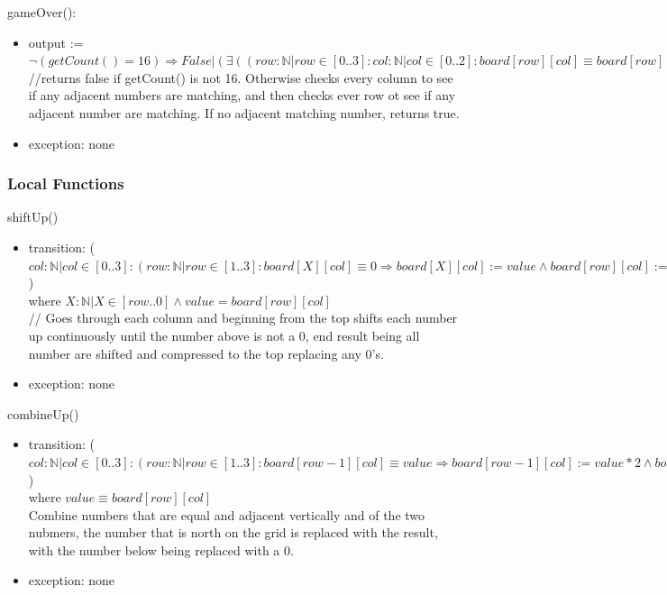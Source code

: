 \documentclass[12pt]{article}
\begin{document}
\noindent gameOver():
\begin{itemize}
    \item output := $\lnot(getCount() = 16) \Rightarrow False \vert (\exists((row :
    \mathbb{N} \vert row \in [0..3] : col : \mathbb{N} \vert col \in
    [0..2]: board[row][col] \equiv board[row][col+1]) \land (col :
    \mathbb{N} \vert col \in [0..3] : row : \mathbb{N} \vert row \in
    [0..2]: board[row][col] \equiv board[row+1][col])) \Rightarrow False |
    True)$\\
    //returns false if getCount() is not 16. Otherwise checks every column
    to see if any adjacent numbers are matching, and then checks ever row
    ot see if any adjacent number are matching. If no adjacent matching
    number, returns true.
    \item exception: none
\end{itemize}


\subsubsection*{Local Functions}

\noindent shiftUp()
\begin{itemize}
    \item transition: ($col : \mathbb{N} \vert col
    \in [0..3]: (row : \mathbb{N} \vert row \in [1..3]:
    board[X][col] \equiv 0 \Rightarrow board[X][col] := value
    \land board[row][col] := 0)$)\\
    where $X : \mathbb{N} | X \in [row .. 0] \land value = board[row][col]$\\
    // Goes through each column and beginning from the top shifts each
    number up continuously until the number above is not a 0, end result
    being all number are shifted and compressed to the top replacing any 0's.
    \item exception: none
\end{itemize}

\noindent combineUp()
\begin{itemize}
    \item transition: ($col : \mathbb{N} \vert col
    \in [0..3]: (row : \mathbb{N} \vert row \in [1..3]: board[row-1][col]
    \equiv value \Rightarrow board[row-1][col] := value * 2 \land
    board[row][col] := 0 \land score := score + value * 2)$)\\
    where $value \equiv board[row][col]$\\
    Combine numbers that are equal and adjacent vertically and of the two
    nubmers, the number that is north on the grid is replaced with the
    result, with the number below being replaced with a 0.
    \item exception: none
\end{itemize}
\end{document}
